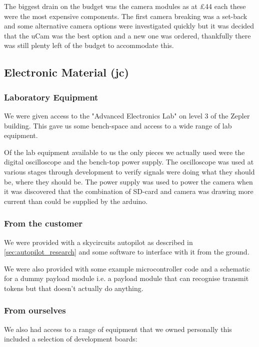 The biggest drain on the budget was the camera modules as at \pounds 44 each these were the most expensive components. The first camera breaking was a set-back and some alternative camera options were investigated quickly but it was decided that the uCam was the best option and a new one was ordered, thankfully there was still plenty left of the budget to accommodate this.

\subsection{Electronic Material (jc)}

\subsubsection{Laboratory Equipment}

We were given access to the "Advanced Electronics Lab" on level 3 of the Zepler building. This gave us some bench-space and access to a wide range of lab equipment.

Of the lab equipment available to us the only pieces we actually used were the digital oscilloscope and the bench-top power supply. The oscilloscope was used at various stages through development to verify signals were doing what they should be, where they should be. The power supply was used to power the camera when it was discovered that the combination of SD-card and camera was drawing more current than could be supplied by the arduino.

\subsubsection{From the customer}

We were provided with a skycircuits autopilot \cite{SkyCircuits} as described in \ref{sec:autopilot_research} and some software to interface with it from the ground.

We were also provided with some example microcontroller code and a schematic for a dummy payload module i.e. a payload module that can recognise transmit tokens but that doesn't actually do anything.

\subsubsection{From ourselves}

We also had access to a range of equipment that we owned personally this included a selection of development boards:

